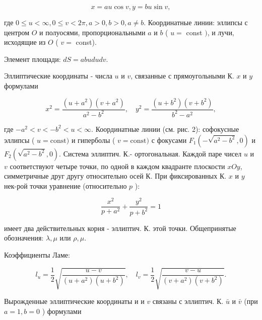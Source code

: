 \documentclass[10pt]{article}
\begin{document}
\[

x=a u \cos v, y=b u \sin v,

\]



где $0 \leqslant u<\infty, 0 \leqslant v<2 \pi, a>0, b>0, a \neq b$. Координатные линии: эллипсы с центром $O$ и полуосями, пропорциональными $a$ и $b$ ( $u=$ const $)$, и лучи, исходящие из $O$ ( $v=$ const).



Элемент площади: $d S=a b u d u d v$.



Эллиптические координаты - числа $u$ и $v$, связанные с прямоугольными К. $x$ и $y$ формулами



\[

x^{2}=\frac{\left(u+a^{2}\right)\left(v+a^{2}\right)}{a^{2}-b^{2}}, \quad y^{2}=\frac{\left(u+b^{2}\right)\left(v+b^{2}\right)}{b^{2}-a^{2}},

\]



где $-a^{2}<v<-b^{2}<u<\infty$. Координатные линии (см. рис. 2): софокусные эллипсы ( $u=\mathrm{const})$ и гиперболы ( $v=\mathrm{const})$ с фокусами $F_{1}\left(-\sqrt{a^{2}-b^{2}}, 0\right)$ и $F_{2}\left(\sqrt{a^{2}-b^{2}}, 0\right)$. Система эллиптич. К.- ортогональная. Каждой паре чисел $u$ и $v$ соответствуют четыре точки, по одной в каждом квадранте плоскости $x O y$, симметричные друг другу относительно осей К. При фиксированных К. $x$ и $y$ нек-рой точки уравнение (относительно $p$ ):



\[

\frac{x^{2}}{p+a^{2}}+\frac{y^{2}}{p+b^{2}}=1

\]



имеет два действительных корня - эллиптич. К. этой точки. Общепринятые обозначения: $\lambda, \mu$ или $\rho, \mu$.



Коэффициенты Ламе:



\[

l_{u}=\frac{1}{2} \sqrt{\frac{u-v}{\left(u+a^{2}\right)\left(u+b^{2}\right)}}, \quad l_{v}=\frac{1}{2} \sqrt{\frac{v-u}{\left(v+a^{2}\right)\left(v+b^{2}\right)}} .

\]



Вырожденные эллиптические координаты $и$ и $v$ связаны с эллиптич. К. $\bar{u}$ и $\bar{v}$ (при $a=1, b=0$ ) формулами
\end{document}
